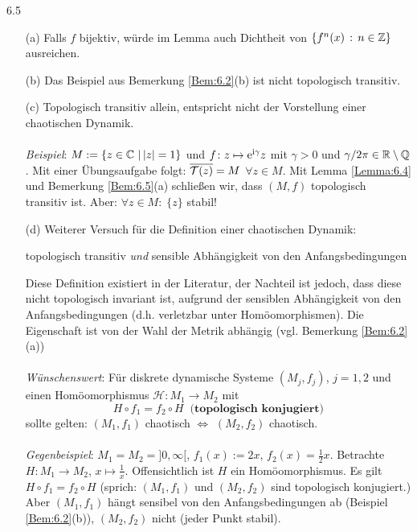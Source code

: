 \documentclass[a4paper]{article}
\begin{document}
\begin{Bemerkung}{}{6.5}
\begin{itemize}
\item[(a)] Falls $f$ bijektiv, würde im Lemma auch Dichtheit von $\{f^n(x)\,:\,n\in\operatorname{\mathbb Z}\}$ ausreichen.
\item[(b)] Das Beispiel aus Bemerkung \ref{Bem:6.2}(b) ist nicht topologisch transitiv.
\item[(c)] Topologisch transitiv allein, entspricht nicht der Vorstellung einer chaotischen Dynamik.\\
\ \\
\textit{Beispiel}: $M:=\{z\in\operatorname{\mathbb C}\,|\,|z|=1\}$ und $f\colon z\mapsto \mathrm{e}^{\mathrm{i}\gamma}z$ mit $\gamma>0$ und $\gamma/2\pi\in\mathbb R\setminus\operatorname{\mathbb Q}$. Mit einer Übungsaufgabe folgt: $\overline{\operatorname{\mathcal{T}}(z)}=M$ $\forall z\in M$. Mit Lemma \ref{Lemma:6.4} und Bemerkung \ref{Bem:6.5}(a) schließen wir, dass $(M,f)$ topologisch transitiv ist. Aber: $\forall z\in M:\;\{z\}$ stabil!
\item[(d)] Weiterer Versuch für die Definition einer chaotischen Dynamik:
\begin{center} topologisch transitiv \textit{und} sensible Abhängigkeit von den Anfangsbedingungen\end{center}
Diese Definition existiert in der Literatur, der Nachteil ist jedoch, dass diese nicht topologisch invariant ist, aufgrund der sensiblen Abhängigkeit von den Anfangsbedingungen (d.h. verletzbar unter Homöomorphismen). Die Eigenschaft ist von der Wahl der Metrik abhängig (vgl. Bemerkung \ref{Bem:6.2}(a))\\
\ \\
\textit{Wünschenswert}: Für diskrete dynamische Systeme $(M_j,f_j)$, $j=1,2$ und einen Homöomorphismus $\mathcal{H}\colon M_1\to M_2$ mit 
\[H\circ f_1=f_2\circ H\;\;\text{(}\textbf{topologisch konjugiert}\text{)}\]
sollte gelten: $(M_1,f_1)$ chaotisch $\iff$ $(M_2,f_2)$ chaotisch.\\
\ \\
\textit{Gegenbeispiel}: $M_1=M_2=]0,\infty[$, $f_1(x):=2x$, $f_2(x)=\frac{1}{2}x$. Betrachte $H\colon M_1\to M_2$, $x\mapsto \frac{1}{x}$. Offensichtlich ist $H$ ein Homöomorphismus. Es gilt $H\circ f_1=f_2\circ H$ (sprich: \glqq $(M_1,f_1)$ und $(M_2,f_2)$ sind topologisch konjugiert\grqq.) Aber $(M_1,f_1)$ hängt sensibel von den Anfangsbedingungen ab (Beispiel \ref{Bem:6.2}(b)), $(M_2,f_2)$ nicht (jeder Punkt stabil).
\end{itemize}
\end{Bemerkung}
\end{document}

